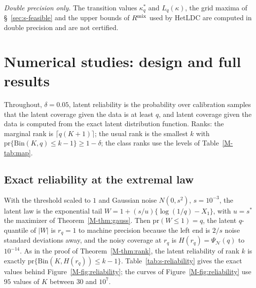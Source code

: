 \documentclass[12pt]{article}
\renewcommand{\_}{\usc\allowbreak}
\theoremstyle{definition}
\numberwithin{equation}{section}
\newcommand{\pr}{\mathrm{pr}}
\newcommand{\N}{\mathcal{N}}
\newcommand{\Bin}{\mathrm{Bin}}
\begin{document}
\emph{Double precision only.} The transition values $\kappa^*_q$ and $L_q(\kappa)$, the grid maxima of \S~\ref{sec:s-feasible} and the upper bounds of $R^{\rm mix}$ used by HetLDC are computed in double precision and are not certified.

\section{Numerical studies: design and full results}\label{sec:s-numerical}

Throughout, $\delta = 0.05$, latent reliability is the probability over calibration samples that the latent coverage given the data is at least $q$, and latent coverage given the data is computed from the exact latent distribution function. Ranks: the marginal rank is $\lceil q(K + 1)\rceil$; the usual rank is the smallest $k$ with $\pr\{\Bin(K, q) \le k - 1\} \ge 1 - \delta$; the class ranks use the levels of Table~\ref{M-tab:map}.

\subsection{Exact reliability at the extremal law}\label{sec:s-reliability}

With the threshold scaled to $1$ and Gaussian noise $N(0, s^2)$, $s = 10^{-3}$, the latent law is the exponential tail $W = 1 + (s/u)\{\log(1/q) - X_1\}$, with $u = s^*$ the maximizer of Theorem~\ref{M-thm:gauss}. Then $\pr(W \le 1) = q$, the latent $q$-quantile of $|W|$ is $r_q = 1$ to machine precision because the left end is $2/s$ noise standard deviations away, and the noisy coverage at $r_q$ is $H(r_q) = \Psi_{\N}(q)$ to $10^{-14}$. As in the proof of Theorem~\ref{M-thm:rank}, the latent reliability of rank $k$ is exactly $\pr\{\Bin(K, H(r_q)) \le k - 1\}$. Table~\ref{tab:s-reliability} gives the exact values behind Figure~\ref{M-fig:reliability}; the curves of Figure~\ref{M-fig:reliability} use $95$ values of $K$ between $30$ and $10^7$.
\end{document}
